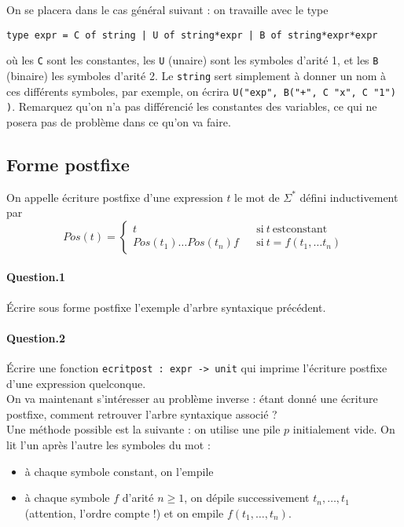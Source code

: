 \documentclass[10pt,a4paper]{article}
\theoremstyle{definition}
\begin{document}
On se placera dans le cas général suivant : on travaille avec le type
 
\texttt{type expr = C of string | U of string*expr | B of string*expr*expr}

où les \texttt{C} sont les constantes, les \texttt{U} (unaire) sont les 
symboles d'arité 1, et les \texttt{B} (binaire) les symboles d'arité 2. Le
\texttt{string} sert simplement à donner un nom à ces différents symboles, par exemple,
on écrira \texttt{U("exp", B("+", C "x", C "1") )}. Remarquez qu'on n'a pas 
différencié les constantes des variables, ce qui ne posera pas de problème dans
ce qu'on va faire.

\subsection{Forme postfixe}
On appelle écriture postfixe d'une expression $t$ le mot de $\Sigma^*$  défini 
inductivement par 
\[Pos(t)=\left\lbrace
\begin{array}{lcl}
t & & \mathrm{si} \ t \ \mathrm{est constant}\\
Pos(t_1)\dots Pos(t_n) f & & \mathrm{si} \ t = f(t_1,\dots t_n)
\end{array}\right.\]

\paragraph{Question.1} Écrire sous forme postfixe l'exemple d'arbre syntaxique 
précédent.

\paragraph{Question.2} Écrire une fonction \texttt{ecritpost : expr -> unit} qui
imprime l'écriture postfixe d'une expression quelconque.
\\

On va maintenant s'intéresser au problème inverse : étant donné une écriture
postfixe, comment retrouver l'arbre syntaxique associé ?
\\

Une méthode possible est la suivante : on utilise une pile $p$ initialement vide.
On lit l'un après l'autre les symboles du mot :
\begin{itemize}
\item à chaque symbole constant, on l'empile
\item à chaque symbole $f$ d'arité $n\geq 1$, on dépile successivement $t_n,\dots, t_1$
(attention, l'ordre compte !) et on empile $f(t_1, \dots, t_n)$.
\end{itemize}
\end{document}
